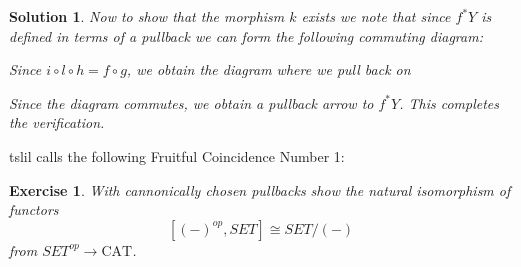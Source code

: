 \documentclass{article}
\theoremstyle{problemstyle}
\theoremstyle{problemstyle}
\theoremstyle{problemstyle}
\theoremstyle{problemstyle}
\theoremstyle{problemstyle}
\theoremstyle{problemstyle}
\newtheorem{solution}{Solution}
\theoremstyle{problemstyle}
\theoremstyle{problemstyle}
\newtheorem{exercise}{Exercise}
\begin{document}
\begin{solution}
Now to show that the morphism $k$ exists we note that since $f^*Y$ is defined in terms of a pullback we can form the following commuting diagram:

\begin{center}
\end{center}

Since $i \circ l \circ h = f \circ g$, we obtain the diagram where we pull back on 

\begin{center}
\end{center}

Since the diagram commutes, we obtain a pullback arrow to $f^*Y$. This completes the verification. 
\end{solution}

tslil calls the following Fruitful Coincidence Number 1: 

\begin{exercise}
With cannonically chosen pullbacks show the natural isomorphism of functors $$[(-)^{op}, SET] \cong SET/(-)$$ from $SET^{op} \rightarrow \text{CAT}$.  
\end{exercise}
\end{document}
